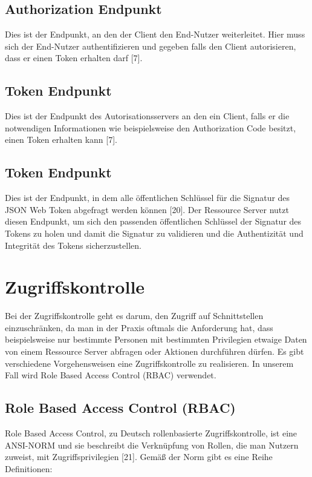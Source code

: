 \subsection{Authorization Endpunkt}
\label{sec:OAuth2EndpunktedesAutorisationsservers:AuthorizationEndpunkt}
Dies ist der Endpunkt, an den der Client den End-Nutzer weiterleitet. Hier muss sich der 
End-Nutzer authentifizieren und gegeben falls den Client autorisieren, dass er einen Token erhalten darf [7].

\subsection{Token Endpunkt}
\label{sec:OAuth2EndpunktedesAutorisationsservers:TokenEndpunkt}
Dies ist der Endpunkt des Autorisationsservers an den ein Client, falls er die notwendigen 
Informationen wie beispielsweise den Authorization Code besitzt, einen Token erhalten 
kann [7].

\subsection{Token Endpunkt}
\label{sec:OAuth2EndpunktedesAutorisationsservers:JSONWebKeySet(JWKS)Endpunkt}
Dies ist der Endpunkt, in dem alle öffentlichen Schlüssel für die Signatur des JSON Web 
Token abgefragt werden können [20]. Der Ressource Server nutzt diesen Endpunkt, um sich 
den passenden öffentlichen Schlüssel der Signatur des Tokens zu holen und damit die 
Signatur zu validieren und die Authentizität und Integrität des Tokens sicherzustellen.

\section{Zugriffskontrolle}
\label{sec:Zugriffskontrolle}
Bei der Zugriffskontrolle geht es darum, den Zugriff auf Schnittstellen einzuschränken, da 
man in der Praxis oftmals die Anforderung hat, dass beispielsweise nur bestimmte 
Personen mit bestimmten Privilegien etwaige Daten von einem Ressource Server abfragen 
oder Aktionen durchführen dürfen.
Es gibt verschiedene Vorgehensweisen eine Zugriffskontrolle zu realisieren. In unserem Fall 
wird Role Based Access Control (RBAC) verwendet. 

\subsection{Role Based Access Control (RBAC)}
\label{sec:Zugriffskontrolle:RoleBasedAccessControl(RBAC)}
Role Based Access Control, zu Deutsch rollenbasierte Zugriffskontrolle, ist eine ANSI-NORM 
und sie beschreibt die Verknüpfung von Rollen, die man Nutzern zuweist, mit 
Zugriffsprivilegien [21]. Gemäß der Norm gibt es eine Reihe Definitionen:

